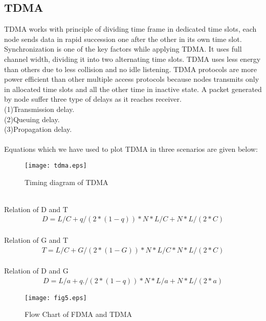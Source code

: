\documentclass[11pt, conference, compsocconf, onecolumn]{IEEEtran}
\begin{document}
\subsection{TDMA}
TDMA works with principle of dividing time frame in dedicated time slots, each node sends data in rapid
succession one after the other in its own time slot. Synchronization is one of the key factors while applying TDMA. It uses full channel width, dividing it
into two alternating time slots. TDMA uses less energy than others due to less collision and no idle listening. TDMA protocols are more power efficient than other multiple access protocols because nodes transmits only in allocated time slots and all the other time in inactive state. A packet generated by node suffer three type of delays as it reaches receiver.
\\
{(1)}Transmission delay.
\\
{(2)}Queuing delay.
\\
{(3)}Propagation delay.
\\
\\
Equations which we have used to plot TDMA in three scenarios are given below:
\begin{figure}[!h]
\centering
\caption{Timing diagram of TDMA}
\texttt{[image: tdma.eps]}
\end{figure}
\\
Relation of D and T
\begin{eqnarray}
D=L/C+q/(2*(1-q))*N*L/C+N*L/(2*C)
\end{eqnarray}
\\
Relation of G and T
\begin{eqnarray}
T=L/C+G/(2*(1-G))*N*L/C*N*L/(2*C)
\end{eqnarray}
\\
Relation of D and G
\begin{eqnarray}
D=L/a+q./(2*(1-q))*N*L/a+N*L/(2*a)
\end{eqnarray}
\begin{figure}[!h]
\centering
\caption{Flow Chart of FDMA and TDMA}
\texttt{[image: fig5.eps]}
\end{figure}
\\
\end{document}
